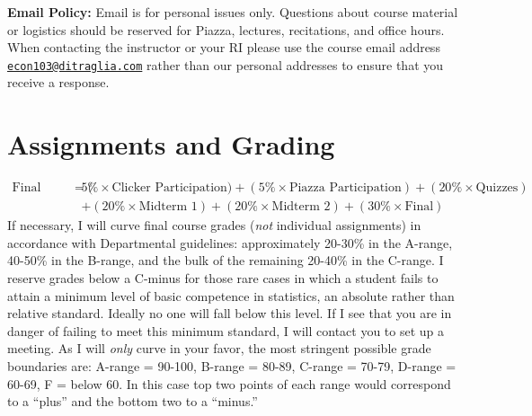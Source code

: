 \documentclass[11pt, letterpaper]{article}
\begin{document}
\bigskip

\noindent \textbf{Email Policy:} Email is for personal issues only. Questions about course material or logistics should be reserved for Piazza, lectures, recitations, and office hours. When contacting the instructor or your RI please use the course email address \href{mailto:econ103@ditraglia.com}{\texttt{econ103@ditraglia.com}} rather than our personal addresses to ensure that you receive a response.

\newpage

\section*{Assignments and Grading}
	\begin{equation*}
	\begin{split}
		\mbox{Final Grade} = (&5\% \times \mbox{Clicker Participation}) + (5\% \times \mbox{Piazza Participation}) + (20\% \times \mbox{Quizzes})  \\ &
							 + (20\% \times \mbox{Midterm 1}) + (20\% \times \mbox{Midterm 2}) + (30\% \times \mbox{Final})
	\end{split}
	\end{equation*}
If necessary, I will curve final course grades (\emph{not} individual assignments) in accordance with Departmental guidelines: approximately 20-30\% in the A-range, 40-50\% in the B-range, and the bulk of the remaining 20-40\% in the C-range. I reserve grades below a C-minus for those rare cases in which a student fails to attain a minimum level of basic competence in statistics, an absolute rather than relative standard. Ideally no one will fall below this level. If I see that you are in danger of failing to meet this minimum standard, I will contact you to set up a meeting. As I will \emph{only} curve in your favor, the most stringent possible grade boundaries are: A-range = 90-100, B-range = 80-89, C-range = 70-79, D-range = 60-69, F = below 60. In this case top two points of each range would correspond to a ``plus'' and the bottom two to a ``minus.'' 

\medskip
\end{document}
